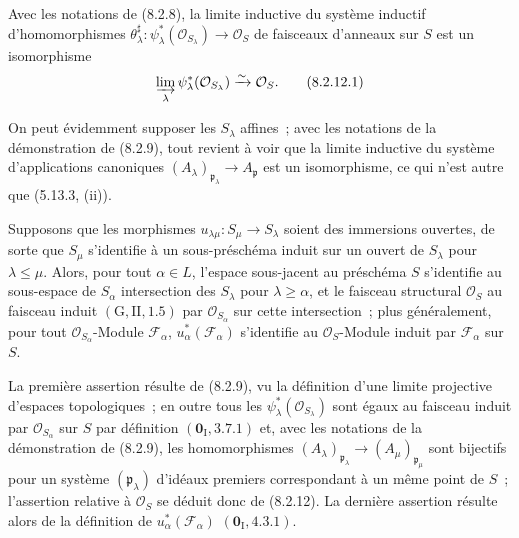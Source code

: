 \begin{corollary}[8.2.12]
\label{IV.8.2.12-fr}
Avec les notations de \textup{(8.2.8)}, la limite inductive du système inductif
d'homomorphismes
$\theta_\lambda^\sharp:\psi_\lambda^*(\mathcal O_{S_\lambda})\to
\mathcal O_S$ de faisceaux d'anneaux sur $S$ est un isomorphisme
\begin{equation}
\varinjlim_\lambda\psi_\lambda^*(\mathcal O_{S_\lambda})
\xrightarrow{\sim}\mathcal O_S.
\tag{8.2.12.1}\label{IV.8.2.12.1-fr}
\end{equation}
\end{corollary}

On peut évidemment supposer les $S_\lambda$ affines~; avec les notations de
la démonstration de (8.2.9), tout revient à voir que la limite inductive du
système d'applications canoniques
$(A_\lambda)_{\mathfrak p_\lambda}\to A_{\mathfrak p}$ est un isomorphisme,
ce qui n'est autre que (5.13.3, (ii)).

\begin{proposition}[8.2.13]
\label{IV.8.2.13-fr}
Supposons que les morphismes $u_{\lambda\mu}:S_\mu\to S_\lambda$ soient des
immersions ouvertes, de sorte que $S_\mu$ s'identifie à un sous-préschéma
induit sur un ouvert de $S_\lambda$ pour $\lambda\leq\mu$. Alors, pour tout
$\alpha\in L$, l'espace sous-jacent au préschéma $S$ s'identifie au
sous-espace de $S_\alpha$ intersection des $S_\lambda$ pour
$\lambda\geq\alpha$, et le faisceau structural $\mathcal O_S$ au faisceau
induit $(\mathrm G,\mathrm{II},1.5)$ par $\mathcal O_{S_\alpha}$ sur cette
intersection~; plus généralement, pour tout $\mathcal O_{S_\alpha}$-Module
$\mathscr F_\alpha$, $u_\alpha^*(\mathscr F_\alpha)$ s'identifie au
$\mathcal O_S$-Module induit par $\mathscr F_\alpha$ sur $S$.
\end{proposition}

La première assertion résulte de (8.2.9), vu la définition d'une limite
projective d'espaces topologiques~; en outre tous les
$\psi_\lambda^*(\mathcal O_{S_\lambda})$ sont égaux au faisceau induit par
$\mathcal O_{S_\alpha}$ sur $S$ par définition $(\mathbf{0}_{\mathrm I},3.7.1)$ et,
avec les notations de la démonstration de (8.2.9), les homomorphismes
$(A_\lambda)_{\mathfrak p_\lambda}\to
(A_\mu)_{\mathfrak p_\mu}$ sont bijectifs pour un système
$(\mathfrak p_\lambda)$ d'idéaux premiers correspondant à un même point de
$S$~; l'assertion relative à $\mathcal O_S$ se déduit donc de (8.2.12). La
dernière assertion résulte alors de la définition de
$u_\alpha^*(\mathscr F_\alpha)$ $(\mathbf{0}_{\mathrm I},4.3.1)$.

